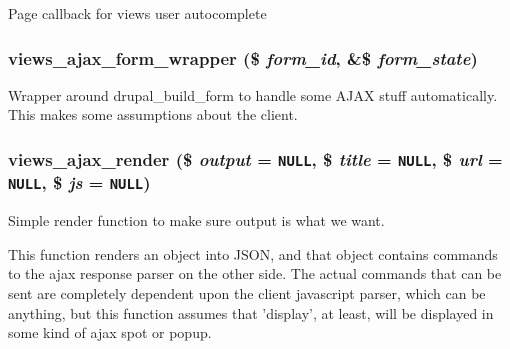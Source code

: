 Page callback for views user autocomplete \hypertarget{group__ajax_g7eed0d665d7b4c8c8134eb060afbb2be}{
\subsubsection[{views\_\-ajax\_\-form\_\-wrapper}]{\setlength{\rightskip}{0pt plus 5cm}views\_\-ajax\_\-form\_\-wrapper (\$ {\em form\_\-id}, \/  \&\$ {\em form\_\-state})}}
\label{group__ajax_g7eed0d665d7b4c8c8134eb060afbb2be}


Wrapper around drupal\_\-build\_\-form to handle some AJAX stuff automatically. This makes some assumptions about the client. \hypertarget{group__ajax_gb8d3fb5832b13ebecfc2367a923ea01d}{
\subsubsection[{views\_\-ajax\_\-render}]{\setlength{\rightskip}{0pt plus 5cm}views\_\-ajax\_\-render (\$ {\em output} = {\tt NULL}, \/  \$ {\em title} = {\tt NULL}, \/  \$ {\em url} = {\tt NULL}, \/  \$ {\em js} = {\tt NULL})}}
\label{group__ajax_gb8d3fb5832b13ebecfc2367a923ea01d}


Simple render function to make sure output is what we want.

This function renders an object into JSON, and that object contains commands to the ajax response parser on the other side. The actual commands that can be sent are completely dependent upon the client javascript parser, which can be anything, but this function assumes that 'display', at least, will be displayed in some kind of ajax spot or popup. 